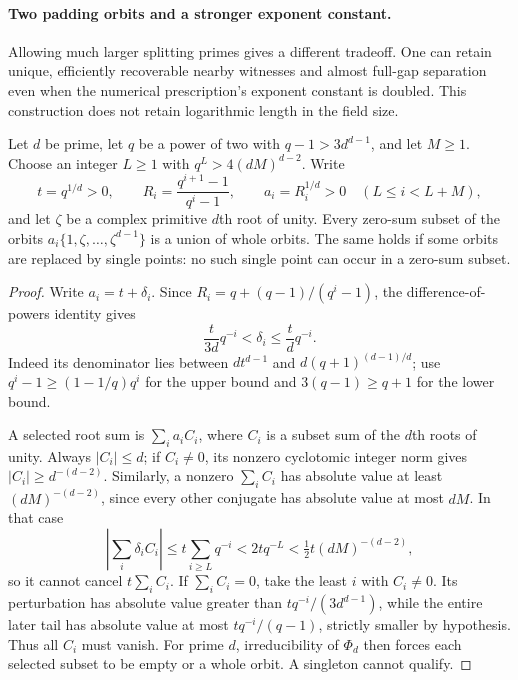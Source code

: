 \paragraph{Two padding orbits and a stronger exponent constant.}
Allowing much larger splitting primes gives a different tradeoff. One
can retain unique, efficiently recoverable nearby witnesses and almost
full-gap separation even when the numerical prescription's exponent
constant is doubled. This construction does not retain logarithmic
length in the field size.

\begin{lemma}\label{tou:rigidity}
Let $d$ be prime, let $q$ be a power of two with
$q-1>3d^{d-1}$, and let $M\ge1$. Choose an integer $L\ge1$ with
$q^L>4(dM)^{d-2}$. Write
\[
 t=q^{1/d}>0,\qquad
 R_i=\frac{q^{i+1}-1}{q^i-1},\qquad
 a_i=R_i^{1/d}>0\quad(L\le i<L+M),
\]
and let $\zeta$ be a complex primitive $d$th root of unity.
Every zero-sum subset of the orbits $a_i\{1,\zeta,\ldots,\zeta^{d-1}\}$
is a union of whole orbits.
The same holds if some orbits are replaced by single points: no such
single point can occur in a zero-sum subset.
\end{lemma}
\begin{proof}
Write $a_i=t+\delta_i$. Since
$R_i=q+(q-1)/(q^i-1)$, the difference-of-powers identity gives
\[
 \frac{t}{3d}q^{-i}<\delta_i\le\frac{t}{d}q^{-i}.
\]
Indeed its denominator lies between $dt^{d-1}$ and
$d(q+1)^{(d-1)/d}$; use $q^i-1\ge(1-1/q)q^i$
for the upper bound and $3(q-1)\ge q+1$ for the lower bound.

A selected root sum is $\sum_i a_i C_i$, where $C_i$ is a subset sum
of the $d$th roots of unity. Always $|C_i|\le d$; if $C_i\ne0$,
its nonzero cyclotomic integer norm gives
$|C_i|\ge d^{-(d-2)}$. Similarly, a nonzero $\sum_i C_i$ has absolute
value at least $(dM)^{-(d-2)}$, since every other conjugate has
absolute value at most $dM$. In that case
\[
 \left|\sum_i\delta_i C_i\right|
 \le t\sum_{i\ge L}q^{-i}<2tq^{-L}
 <\tfrac12t(dM)^{-(d-2)},
\]
so it cannot cancel $t\sum_i C_i$.
If $\sum_i C_i=0$, take the least $i$ with $C_i\ne0$.
Its perturbation has absolute value greater than
$tq^{-i}/(3d^{d-1})$, while the entire later tail has absolute value
at most $tq^{-i}/(q-1)$, strictly smaller by hypothesis.
Thus all $C_i$ must vanish. For prime $d$, irreducibility of $\Phi_d$
then forces each selected subset to be empty or a whole orbit.
A singleton cannot qualify.
\end{proof}

